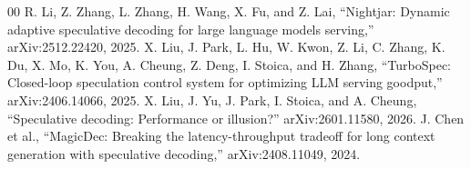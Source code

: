 \documentclass[conference]{IEEEtran}
\begin{document}
\begin{thebibliography}{00}
 R. Li, Z. Zhang, L. Zhang, H. Wang, X. Fu, and Z. Lai, ``Nightjar: Dynamic adaptive speculative decoding for large language models serving,'' arXiv:2512.22420, 2025.
 X. Liu, J. Park, L. Hu, W. Kwon, Z. Li, C. Zhang, K. Du, X. Mo, K. You, A. Cheung, Z. Deng, I. Stoica, and H. Zhang, ``TurboSpec: Closed-loop speculation control system for optimizing LLM serving goodput,'' arXiv:2406.14066, 2025.
 X. Liu, J. Yu, J. Park, I. Stoica, and A. Cheung, ``Speculative decoding: Performance or illusion?'' arXiv:2601.11580, 2026.
 J. Chen et al., ``MagicDec: Breaking the latency-throughput tradeoff for long context generation with speculative decoding,'' arXiv:2408.11049, 2024.
\end{thebibliography}
\end{document}
